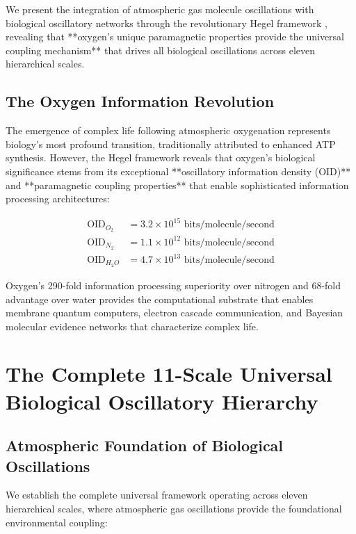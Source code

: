 \documentclass[twocolumn]{article}
\begin{document}
We present the integration of atmospheric gas molecule oscillations with biological oscillatory networks through the revolutionary Hegel framework \citep{hegel2024}, revealing that **oxygen's unique paramagnetic properties provide the universal coupling mechanism** that drives all biological oscillations across eleven hierarchical scales.

\subsection{The Oxygen Information Revolution}

The emergence of complex life following atmospheric oxygenation represents biology's most profound transition, traditionally attributed to enhanced ATP synthesis. However, the Hegel framework reveals that oxygen's biological significance stems from its exceptional **oscillatory information density (OID)** and **paramagnetic coupling properties** that enable sophisticated information processing architectures:

\begin{align}
\text{OID}_{O_2} &= 3.2 \times 10^{15} \text{ bits/molecule/second} \\
\text{OID}_{N_2} &= 1.1 \times 10^{12} \text{ bits/molecule/second} \\
\text{OID}_{H_2O} &= 4.7 \times 10^{13} \text{ bits/molecule/second}
\end{align}

Oxygen's 290-fold information processing superiority over nitrogen and 68-fold advantage over water provides the computational substrate that enables membrane quantum computers, electron cascade communication, and Bayesian molecular evidence networks that characterize complex life.

\section{The Complete 11-Scale Universal Biological Oscillatory Hierarchy}

\subsection{Atmospheric Foundation of Biological Oscillations}

We establish the complete universal framework operating across eleven hierarchical scales, where atmospheric gas oscillations provide the foundational environmental coupling:
\end{document}
